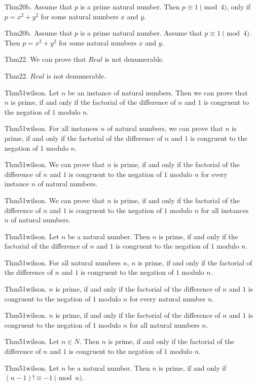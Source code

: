 \documentclass{article}
\begin{document}
Thm20b. Assume that $p$ is a prime natural number. Then $p \equiv 1 \pmod{ 4}$, only if $p = x ^{ 2}+ y ^{ 2}$ for some natural numbers $x$ and $y$.

Thm20b. Assume that $p$ is a prime natural number. Assume that $p \equiv 1 \pmod{ 4}$. Then $p = x ^{ 2}+ y ^{ 2}$ for some natural numbers $x$ and $y$.

Thm22. We can prove that $Real$ is not denumerable.

Thm22. $Real$ is not denumerable.

Thm51wilson. Let $n$ be an instance of natural numbers. Then we can prove that $n$ is prime, if and only if the factorial of the difference of $n$ and $1$ is congruent to the negation of $1$ modulo $n$.

Thm51wilson. For all instances $n$ of natural numbers, we can prove that $n$ is prime, if and only if the factorial of the difference of $n$ and $1$ is congruent to the negation of $1$ modulo $n$.

Thm51wilson. We can prove that $n$ is prime, if and only if the factorial of the difference of $n$ and $1$ is congruent to the negation of $1$ modulo $n$ for every instance $n$ of natural numbers.

Thm51wilson. We can prove that $n$ is prime, if and only if the factorial of the difference of $n$ and $1$ is congruent to the negation of $1$ modulo $n$ for all instances $n$ of natural numbers.

Thm51wilson. Let $n$ be a natural number. Then $n$ is prime, if and only if the factorial of the difference of $n$ and $1$ is congruent to the negation of $1$ modulo $n$.

Thm51wilson. For all natural numbers $n$, $n$ is prime, if and only if the factorial of the difference of $n$ and $1$ is congruent to the negation of $1$ modulo $n$.

Thm51wilson. $n$ is prime, if and only if the factorial of the difference of $n$ and $1$ is congruent to the negation of $1$ modulo $n$ for every natural number $n$.

Thm51wilson. $n$ is prime, if and only if the factorial of the difference of $n$ and $1$ is congruent to the negation of $1$ modulo $n$ for all natural numbers $n$.

Thm51wilson. Let $n \in N$. Then $n$ is prime, if and only if the factorial of the difference of $n$ and $1$ is congruent to the negation of $1$ modulo $n$.

Thm51wilson. Let $n$ be a natural number. Then $n$ is prime, if and only if $(n - 1)! \equiv - 1 \pmod{ n}$.
\end{document}
